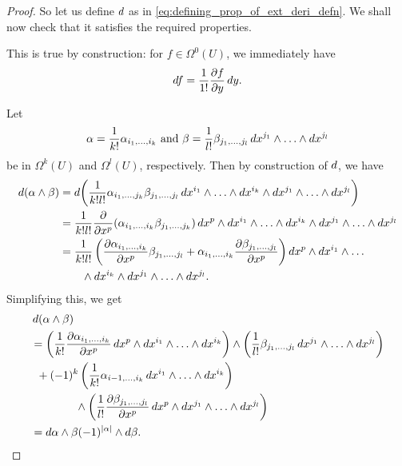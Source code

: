 \documentclass[notoc,notitlepage]{tufte-book}
\begin{document}
\begin{proof}
  So let us define $\mathop{}\!d{}$ as in \cref{eq:defining_prop_of_ext_deri_defn}. We shall now check
  that it satisfies the required properties.

  \noindent
   This is true by
  construction: for $f \in \Omega^0(U)$, we immediately have
  \begin{equation*}
    \mathop{}\!d{f} = \frac{1}{1!} \frac{\partial f}{\partial y} \mathop{}\!d{y}.
  \end{equation*}

  \noindent
   Let
  \begin{equation*}
    \alpha = \frac{1}{k!} \alpha_{i_1, \ldots, i_k} \text{ and } \beta = \frac{1}{l!}
      \beta_{j_1, \ldots, j_l} \mathop{}\!d{x^{j_1}} \land \hdots \land \mathop{}\!d{x^{j_l}}
  \end{equation*}
  be in $\Omega^k(U)$ and $\Omega^l(U)$, respectively. Then by construction of $\mathop{}\!d{}$,
  we have
  \begin{align*}
    \dif{(\alpha \land \beta)}
    &= \dif{\left( \frac{1}{k! l!} \alpha_{i_1, \ldots, j_k} \beta_{j_1, \ldots, j_l}
      \dif{x^{i_1}} \land \hdots \land \dif{x^{i_k}} \land \dif{x^{j_1}} \land \hdots
      \land \dif{x^{j_l}} \right)} \\
    &= \frac{1}{k! l!} \frac{\partial}{\partial x^p} (\alpha_{i_1, \ldots, i_k} \beta_{j_1,
      \ldots, j_k}) \dif{x^p} \land \dif{x^{i_1}} \land \hdots \land \dif{x^{i_k}} \land
      \dif{x^{j_1}} \land \hdots \land \dif{x^{j_l}} \\
    &= \frac{1}{k! l!} \left( \frac{\partial \alpha_{i_1, \ldots, i_k}}{\partial x^p}
      \beta_{j_1, \ldots, j_l} + \alpha_{i_1, \ldots, i_k} \frac{\partial \beta_{j_1,
      \ldots, j_l}}{\partial x^p} \right) \dif{x^p} \land \dif{x^{i_1}} \land \hdots \\
    &\qquad \land \dif{x^{i_k}} \land \dif{x^{j_1}} \land \hdots \land \dif{x^{j_l}}.
  \end{align*}
  Simplifying this, we get
  \begin{align*}
    &\dif{(\alpha \land \beta)} \\
    &= \left( \frac{1}{k!} \frac{\partial \alpha_{i_1, \ldots, i_k}}{\partial x^p}
      \dif{x^p} \land \dif{x^{i_1}} \land \hdots \land \dif{x^{i_k}} \right) \land \left(
      \frac{1}{l!} \beta_{j_1, \ldots, j_l} \dif{x^{j_1}} \land \hdots \land \dif{x^{j_l}}
      \right) \\
    &\enspace + (-1)^k \left( \frac{1}{k!} \alpha_{i-1, \ldots, i_k} \dif{x^{i_1}} \land
      \hdots \land \dif{x^{i_k}} \right) \\
    &\qquad\qquad \land \left( \frac{1}{l!} \frac{\partial \beta_{j_1, \ldots, j_l}}{\partial
      x^p} \dif{x^p} \land \dif{x^{j_1}} \land \hdots \land \dif{x^{j_l}} \right) \\
    &= \dif{\alpha} \land \beta (-1)^{\abs{\alpha}} \land \dif{\beta}.
  \end{align*}


\end{proof}
\end{document}
